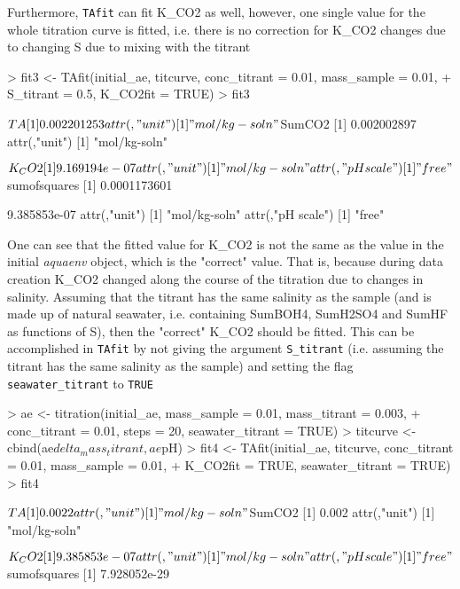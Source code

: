 \documentclass[article,nojss]{jss}
\begin{document}
Furthermore, \texttt{TAfit} can fit K\_CO2 as well, however, one single value for the whole titration curve is fitted, i.e. there is no correction for K\_CO2 changes due to changing S due to mixing with the titrant
\begin{Schunk}
\begin{Sinput}
> fit3 <- TAfit(initial_ae, titcurve, conc_titrant = 0.01, mass_sample = 0.01, 
+     S_titrant = 0.5, K_CO2fit = TRUE)
> fit3
\end{Sinput}
\begin{Soutput}
$TA
[1] 0.002201253
attr(,"unit")
[1] "mol/kg-soln"

$SumCO2
[1] 0.002002897
attr(,"unit")
[1] "mol/kg-soln"

$K_CO2
[1] 9.169194e-07
attr(,"unit")
[1] "mol/kg-soln"
attr(,"pH scale")
[1] "free"

$sumofsquares
[1] 0.0001173601
\end{Soutput}
\begin{Soutput}
[1] 9.385853e-07
attr(,"unit")
[1] "mol/kg-soln"
attr(,"pH scale")
[1] "free"
\end{Soutput}
\end{Schunk}

One can see that the fitted value for K\_CO2 is not the same as the value in the initial \textit{aquaenv} object, which is the "correct" value. That is, because during data creation K\_CO2 changed along the course of the titration
due to changes in salinity. Assuming that the titrant has the same salinity as the sample (and is made up of natural seawater, i.e. containing SumBOH4, SumH2SO4 and SumHF as functions of S),
 then the "correct" K\_CO2 should be fitted. This can be accomplished in \texttt{TAfit} by not giving the argument \texttt{S\_titrant} (i.e. assuming the titrant has the 
same salinity as the sample) and 
setting the flag \texttt{seawater\_titrant} to \texttt{TRUE}

\begin{Schunk}
\begin{Sinput}
> ae <- titration(initial_ae, mass_sample = 0.01, mass_titrant = 0.003, 
+     conc_titrant = 0.01, steps = 20, seawater_titrant = TRUE)
> titcurve <- cbind(ae$delta_mass_titrant, ae$pH)
> fit4 <- TAfit(initial_ae, titcurve, conc_titrant = 0.01, mass_sample = 0.01, 
+     K_CO2fit = TRUE, seawater_titrant = TRUE)
> fit4
\end{Sinput}
\begin{Soutput}
$TA
[1] 0.0022
attr(,"unit")
[1] "mol/kg-soln"

$SumCO2
[1] 0.002
attr(,"unit")
[1] "mol/kg-soln"

$K_CO2
[1] 9.385853e-07
attr(,"unit")
[1] "mol/kg-soln"
attr(,"pH scale")
[1] "free"

$sumofsquares
[1] 7.928052e-29
\end{Soutput}
\end{Schunk}
\end{document}
